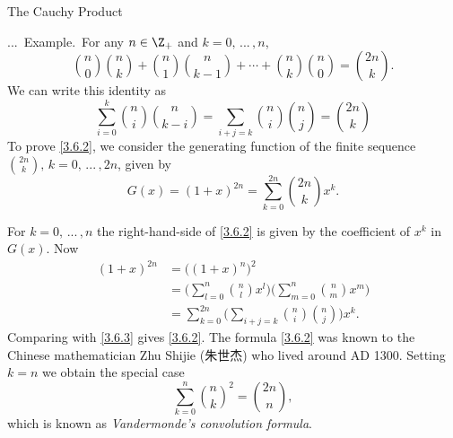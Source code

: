 \documentclass[smaller,hyperref={CJKbookmarks=true}]{beamer}
\newcounter{zhuo}[subsection]
\renewcommand{\thezhuo}{\thesection.\thesubsection.\arabic{zhuo}}
\newenvironment{EXAMPLE}{\stepcounter{zhuo}\alert{\!\thezhuo.~Example.\,}}{}
\begin{document}
\begin{frame}{The Cauchy Product}
\begin{spacing}{1}
\newpage
\begin{EXAMPLE}
For any $n\in\Z_+$ and $k=0,\,...\,,n$,
\[\binom{n}{0}\binom{n}{k}+\binom{n}{1}\binom{n}{k-1}+\cdots+\binom{n}{k}\binom{n}{0}
=\binom{2n}{k}.\]
We can write this identity as
\begin{equation}\label{3.6.2}
\sum_{i=0}^{k}\binom{n}{i}\binom{n}{k-i}=\sum_{i+j=k}\binom{n}{i}
\binom{n}{j}=\binom{2n}{k}
\end{equation}
To prove \eqref{3.6.2}, we consider the generating function of the finite sequence $\binom{2n}{k},\,k=0,\,...\,,2n$, given by
\begin{equation}\label{3.6.3}
G(x)=(1+x)^{2n}=\sum_{k=0}^{2n}\binom{2n}{k}x^k.
\end{equation}
\end{EXAMPLE}
\end{spacing}
\newpage
\begin{spacing}{0.4}
For $k=0,\,...\,,n$ the right-hand-side of \eqref{3.6.2} is given by the coefficient of $x^k$ in $G(x)$. Now
\begin{equation*}
  \begin{split}
     (1+x)^{2n} &=\big((1+x)^n\big)^2 \\
       &=\Big(\sum_{l=0}^{n}\binom{n}{l}x^l\Big)\Big(\sum_{m=0}^{n}\binom{n}{m}x^m\Big) \\
       &=\sum_{k=0}^{2n}\Big(\sum_{i+j=k}\binom{n}{i}\binom{n}{j}\Big)x^k.
  \end{split}
\end{equation*}
Comparing with \eqref{3.6.3} gives \eqref{3.6.2}. The formula \eqref{3.6.2} was known to the Chinese mathematician Zhu Shijie (朱世杰) who lived around AD 1300. Setting $k=n$ we obtain the special case
\[\sum_{k=0}^{n}\binom{n}{k}^2=\binom{2n}{n},\]
which is known as \emph{Vandermonde's convolution formula}.
\end{spacing}
\end{frame}
\end{document}
